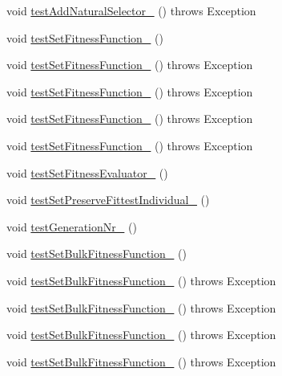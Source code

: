 \begin{DoxyCompactItemize}
\item 
void \hyperlink{classorg_1_1jgap_1_1_configuration_test_afe9322e379167c3f4356270377cf3c98}{test\-Add\-Natural\-Selector\-\_} ()  throws Exception 
\item 
void \hyperlink{classorg_1_1jgap_1_1_configuration_test_abcb96ccbd6d01b739edff86ba36e730d}{test\-Set\-Fitness\-Function\-\_} ()
\item 
void \hyperlink{classorg_1_1jgap_1_1_configuration_test_af8d7f401ae63842cecf01425b3e943de}{test\-Set\-Fitness\-Function\-\_} ()  throws Exception 
\item 
void \hyperlink{classorg_1_1jgap_1_1_configuration_test_a9bf89b8efcc5ab72f960a531586f53dd}{test\-Set\-Fitness\-Function\-\_} ()  throws Exception 
\item 
void \hyperlink{classorg_1_1jgap_1_1_configuration_test_a59d0f429b503bb07a8cd91a607a59d09}{test\-Set\-Fitness\-Function\-\_} ()  throws Exception 
\item 
void \hyperlink{classorg_1_1jgap_1_1_configuration_test_a4b07f1eb917609f0b1f28c28b71612b6}{test\-Set\-Fitness\-Function\-\_} ()  throws Exception 
\item 
void \hyperlink{classorg_1_1jgap_1_1_configuration_test_aa1bba16aae658ae40deae7ca9ba9a272}{test\-Set\-Fitness\-Evaluator\-\_} ()
\item 
void \hyperlink{classorg_1_1jgap_1_1_configuration_test_a77a5b368471438848f565a969aa9ad4f}{test\-Set\-Preserve\-Fittest\-Individual\-\_} ()
\item 
void \hyperlink{classorg_1_1jgap_1_1_configuration_test_a699ed506d924c2a335b4624ccac3f4b3}{test\-Generation\-Nr\-\_} ()
\item 
void \hyperlink{classorg_1_1jgap_1_1_configuration_test_afa98724829d512b5eebbac7b49164891}{test\-Set\-Bulk\-Fitness\-Function\-\_} ()
\item 
void \hyperlink{classorg_1_1jgap_1_1_configuration_test_a33aa9763a36660ecf742228221c22ee6}{test\-Set\-Bulk\-Fitness\-Function\-\_} ()  throws Exception 
\item 
void \hyperlink{classorg_1_1jgap_1_1_configuration_test_a00c054f859f48027738ec082a3b922e6}{test\-Set\-Bulk\-Fitness\-Function\-\_} ()  throws Exception 
\item 
void \hyperlink{classorg_1_1jgap_1_1_configuration_test_a8f1d640b7f79201c122cb16f75ca2d51}{test\-Set\-Bulk\-Fitness\-Function\-\_} ()  throws Exception 
\item 
void \hyperlink{classorg_1_1jgap_1_1_configuration_test_af6ff975ca8348d98909d971a140912da}{test\-Set\-Bulk\-Fitness\-Function\-\_} ()  throws Exception 

\end{DoxyCompactItemize}
